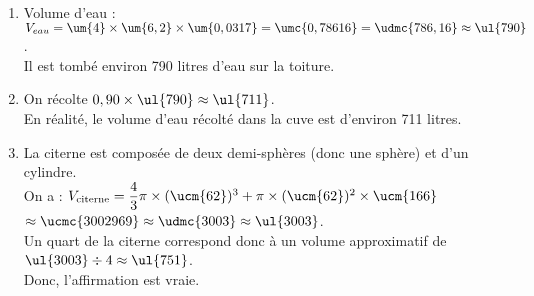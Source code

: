 \ \\ [-5mm]
   \begin{enumerate}
      \item Volume d'eau : $V_{eau} =\um{4}\times\um{6,2}\times\um{0,0317} =\umc{0,78616} =\udmc{786,16} \approx \ul{790}$. \\
         {\blue Il est tombé environ 790 litres d'eau sur la toiture}.
      \item On récolte $0,90\times\ul{790} \approx\ul{711}$. \\
         {\blue En réalité, le volume d'eau récolté dans la cuve est d'environ 711 litres.}
      \item La citerne est composée de deux demi-sphères (donc une sphère) et d'un cylindre. \\
         On a : $V_{\text{citerne}} = \dfrac43\pi\times(\ucm{62})^3+\pi\times(\ucm{62})^2\times\ucm{166}$ \\ [1mm]
         \hspace*{2cm} $\approx \ucmc{3002969}  \approx \udmc{3003} \approx \ul{3003}$. \\ [1mm]
         Un quart de la citerne correspond donc à un volume approximatif de $\ul{3003}\div4 \approx\ul{751}$. \\
         Donc, {\blue l'affirmation est vraie}.
   \end{enumerate}
